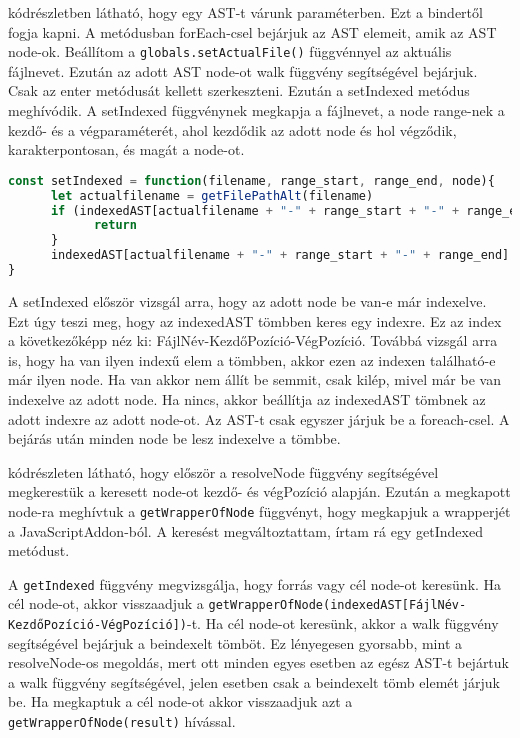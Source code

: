  kódrészletben látható, hogy egy AST-t várunk paraméterben. Ezt a bindertől fogja kapni.
A metódusban forEach-csel bejárjuk az AST elemeit, amik az AST node-ok.
Beállítom a \texttt{globals.setActualFile()} függvénnyel az aktuális fájlnevet.
Ezután az adott AST node-ot walk függvény segítségével bejárjuk.
Csak az enter metódusát kellett szerkeszteni.
Ezután a setIndexed metódus meghívódik.
A setIndexed függvénynek megkapja a fájlnevet, a node range-nek a kezdő- és a végparaméterét, ahol kezdődik az adott node és hol végződik, karakterpontosan, és magát a node-ot.

\begin{lstlisting}[caption={setIndexed metódus}, label={lst:setIndexed_function}, language={JavaScript}]
const setIndexed = function(filename, range_start, range_end, node){
      let actualfilename = getFilePathAlt(filename)
      if (indexedAST[actualfilename + "-" + range_start + "-" + range_end] !== undefined && indexedAST[actualfilename + "-" + range_start + "-" + range_end] !== node){
            return
      }
      indexedAST[actualfilename + "-" + range_start + "-" + range_end] = node
}
\end{lstlisting}

A setIndexed először vizsgál arra, hogy az adott node be van-e már indexelve.
Ezt úgy teszi meg, hogy az indexedAST tömbben keres egy indexre.
Ez az index a következőképp néz ki: FájlNév-KezdőPozíció-VégPozíció.
Továbbá vizsgál arra is, hogy ha van ilyen indexű elem a tömbben, akkor ezen az indexen található-e már ilyen node.
Ha van akkor nem állít be semmit, csak kilép, mivel már be van indexelve az adott node. Ha nincs, akkor beállítja az indexedAST tömbnek az adott indexre az adott node-ot.
Az AST-t csak egyszer járjuk be a foreach-csel. A bejárás után minden node be lesz indexelve a tömbbe.

\noindent

 kódrészleten látható, hogy először a resolveNode függvény segítségével megkerestük a keresett node-ot kezdő- és végPozíció alapján.
Ezután a megkapott node-ra meghívtuk a \texttt{getWrapperOfNode} függvényt, hogy megkapjuk a wrapperjét a JavaScriptAddon-ból.
A keresést megváltoztattam, írtam rá egy getIndexed metódust.

\noindent

A \texttt{getIndexed} függvény megvizsgálja, hogy forrás vagy cél node-ot keresünk.
Ha cél node-ot, akkor visszaadjuk a \texttt{getWrapperOfNode(indexedAST[FájlNév-KezdőPozíció-VégPozíció])}-t.
Ha cél node-ot keresünk, akkor a walk függvény segítségével bejárjuk a beindexelt tömböt.
Ez lényegesen gyorsabb, mint a resolveNode-os megoldás, mert ott minden egyes esetben az egész AST-t bejártuk a walk függvény segítségével, jelen esetben csak a beindexelt tömb elemét járjuk be.
Ha megkaptuk a cél node-ot akkor visszaadjuk azt a \texttt{getWrapperOfNode(result)} hívással.

